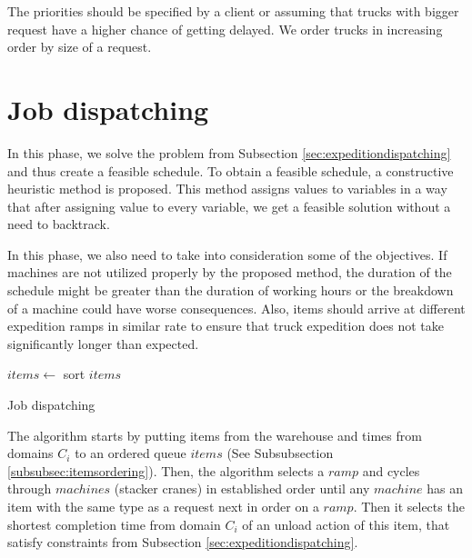 \documentclass{ctuthesis}
\begin{document}
The priorities should be specified by a client or assuming that trucks with bigger request have a higher chance of getting delayed. We order trucks in increasing order by size of a request.

\section{Job dispatching}
\label{sec:jobdispatching}

In this phase, we solve the problem from Subsection \ref{sec:expeditiondispatching} and thus create a feasible schedule.
To obtain a feasible schedule, a constructive heuristic method is proposed. This method assigns values to variables in a way that after assigning value to every variable, we get a feasible solution without a need to backtrack.

In this phase, we also need to take into consideration some of the objectives. If machines are not utilized properly by the proposed method, the duration of the schedule might be greater than the duration of working hours or the breakdown of a machine could have worse consequences. Also, items should arrive at different expedition ramps in similar rate to ensure that truck expedition does not take significantly longer than expected.
 
\begin{algorithm}[H]
\SetAlgoLined
{}
  $items \leftarrow$ sort $items$\;
\caption{Job dispatching}
\end{algorithm}

The algorithm starts by putting items from the warehouse and times from domains $C_i$ to an ordered queue $items$ (See Subsubsection \ref{subsubsec:itemsordering}). Then, the algorithm selects a $ramp$ and cycles through $machines$ (stacker cranes) in established order until any $machine$ has an item with the same type as a request next in order on a $ramp$. Then it selects the shortest completion time from domain $C_i$ of an unload action of this item, that satisfy constraints from Subsection \ref{sec:expeditiondispatching}. 
\end{document}
